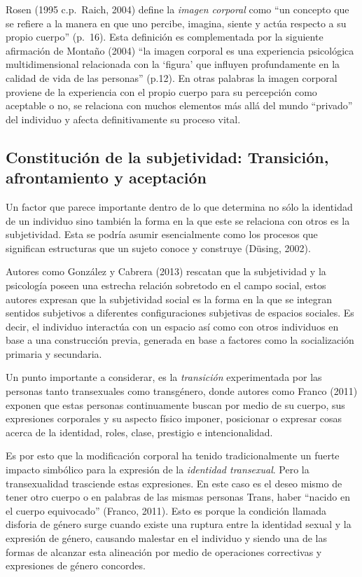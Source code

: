 Rosen (1995 c.p.~Raich, 2004) define la \emph{imagen corporal} como “un concepto que
se refiere a la manera en que uno percibe, imagina, siente y actúa respecto a su
propio cuerpo” (p.~16).
Esta definición es complementada por la siguiente afirmación de Montaño (2004)
“la imagen corporal es una experiencia psicológica multidimensional relacionada
con la ‘figura’ que influyen profundamente en la calidad de vida de las
personas” (p.12).
En otras palabras la imagen corporal proviene de la experiencia con el propio
cuerpo para su percepción como aceptable o no, se relaciona con muchos elementos
más allá del mundo “privado” del individuo y afecta definitivamente su proceso
vital.

\subsection{Constitución de la subjetividad: Transición, afrontamiento y
aceptación}
Un factor que parece importante dentro de lo que determina no sólo la identidad
de un individuo sino también la forma en la que este se relaciona con otros es
la subjetividad.
Esta se podría asumir esencialmente como los procesos que significan
estructuras que un sujeto conoce y construye (Düsing, 2002).

Autores como González y Cabrera (2013) rescatan que la subjetividad y la
psicología poseen una estrecha relación sobretodo en el campo social, estos
autores expresan que la subjetividad social es la forma en la que se integran
sentidos subjetivos a diferentes configuraciones subjetivas de espacios
sociales.
Es decir, el individuo interactúa con un espacio así como con otros individuos
en base a una construcción previa, generada en base a factores como la
socialización primaria y secundaria.

Un punto importante a considerar, es la \emph{transición} experimentada por las
personas tanto transexuales como transgénero, donde autores como Franco (2011)
exponen que estas personas continuamente buscan por medio de su cuerpo, sus
expresiones corporales y su aspecto físico imponer, posicionar o expresar cosas
acerca de la identidad, roles, clase, prestigio e intencionalidad.

Es por esto que la modificación corporal ha tenido tradicionalmente un fuerte
impacto simbólico para la expresión de la \emph{identidad transexual}.
Pero la transexualidad trasciende estas expresiones.
En este caso es el deseo mismo de tener otro cuerpo o en palabras de las mismas
personas Trans, haber “nacido en el cuerpo equivocado” (Franco, 2011).
Esto es porque la condición llamada disforia de género surge cuando existe una
ruptura entre la identidad sexual y la expresión de género, causando malestar en
el individuo y siendo una de las formas de alcanzar esta alineación por medio de
operaciones correctivas y expresiones de género concordes.

